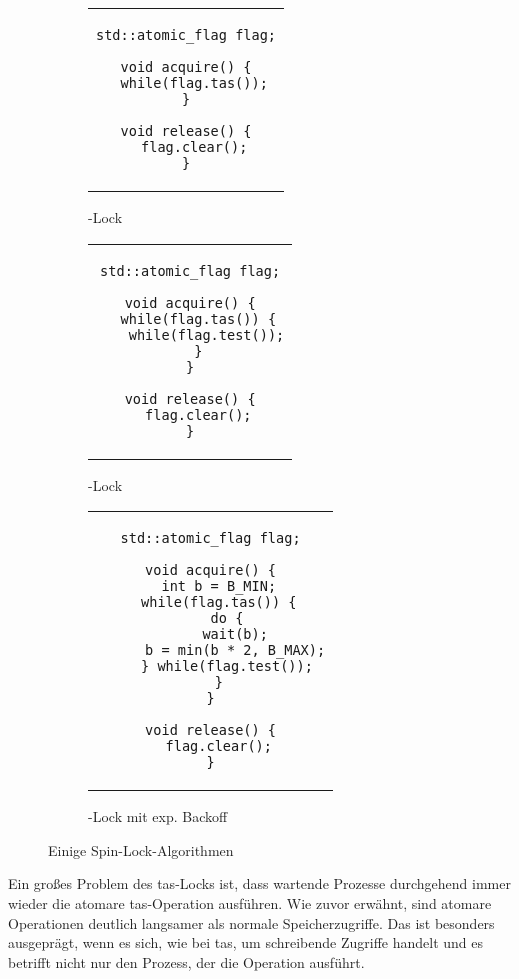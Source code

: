 \begin{figure}[h]
    \begin{subfigure}[b]{.32\textwidth}
        \centering
        \begin{tabular}{c}\begin{lstlisting}
std::atomic_flag flag;

void acquire() {
  while(flag.tas());
}

void release() {
  flag.clear();
}
        \end{lstlisting}\end{tabular}
        \caption{-Lock}
        \label{fig:tas_code}
    \end{subfigure}
    \begin{subfigure}[b]{.32\textwidth}
        \centering
        \begin{tabular}{c}\begin{lstlisting}
std::atomic_flag flag;

void acquire() {
  while(flag.tas()) {
    while(flag.test());
  }
}

void release() {
  flag.clear();
}
        \end{lstlisting}\end{tabular}
        \caption{-Lock}
        \label{fig:tts_code}
    \end{subfigure}
    \begin{subfigure}[b]{.32\textwidth}
        \centering
        \begin{tabular}{c}\begin{lstlisting}
std::atomic_flag flag;

void acquire() {
  int b = B_MIN;
  while(flag.tas()) {
    do {
      wait(b);
      b = min(b * 2, B_MAX);
    } while(flag.test());
  }
}

void release() {
  flag.clear();
}
        \end{lstlisting}\end{tabular}
        \caption{-Lock mit exp. Backoff}
        \label{fig:tts_bo_code}
    \end{subfigure}
    \caption{Einige Spin-Lock-Algorithmen}
    \label{fig:spin_locks_code}
\end{figure}

Ein großes Problem des \gls{tas}-Locks ist,
dass wartende Prozesse durchgehend immer wieder die atomare \gls{tas}-Operation ausführen.
Wie zuvor erwähnt,
sind atomare Operationen deutlich langsamer
als normale Speicherzugriffe.
Das ist besonders ausgeprägt,
wenn es sich,
wie bei \gls{tas},
um schreibende Zugriffe handelt
und es betrifft nicht nur den Prozess,
der die Operation ausführt.

